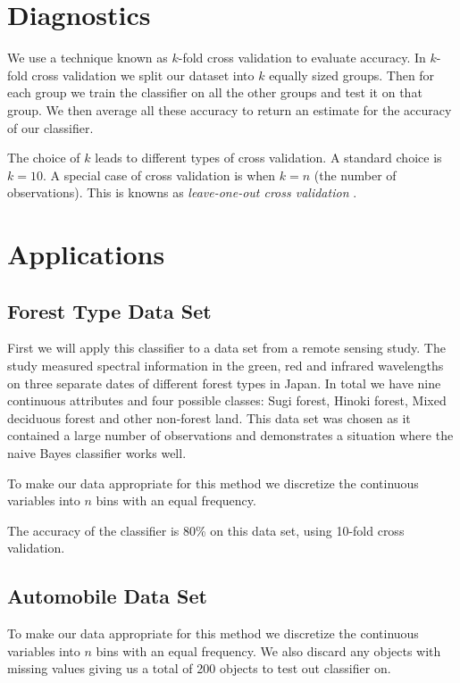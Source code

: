 \section{Diagnostics}

We use a technique known as $k$-fold cross validation to evaluate accuracy.
In $k$-fold cross validation we split our dataset into $k$ equally sized groups.
Then for each group we train the classifier on all the other groups and test it on that group.
We then average all these accuracy to return an estimate for the accuracy of our classifier.

The choice of $k$ leads to different types of cross validation.
A standard choice is $k=10$. A special case of cross validation is when $k=n$ (the number of observations).
This is knowns as \textit{leave-one-out cross validation} \cite{Priddy05}.

\section{Applications}

\subsection{Forest Type Data Set}

First we will apply this classifier to a data set from a remote sensing study.
The study measured spectral information in the green, red and infrared wavelengths on three separate dates of different forest types in Japan.
In total we have nine continuous attributes and four possible classes: Sugi forest, Hinoki forest, Mixed deciduous forest and other non-forest land. This data set was chosen as it contained a large number of observations and demonstrates a situation where the naive Bayes classifier works well.

To make our data appropriate for this method we discretize the continuous variables into $n$ bins with an equal frequency.

The accuracy of the classifier is 80\% on this data set, using 10-fold cross validation.

\subsection{Automobile Data Set}

To make our data appropriate for this method we discretize the continuous variables into $n$ bins with an equal frequency.
We also discard any objects with missing values giving us a total of 200 objects to test out classifier on.

